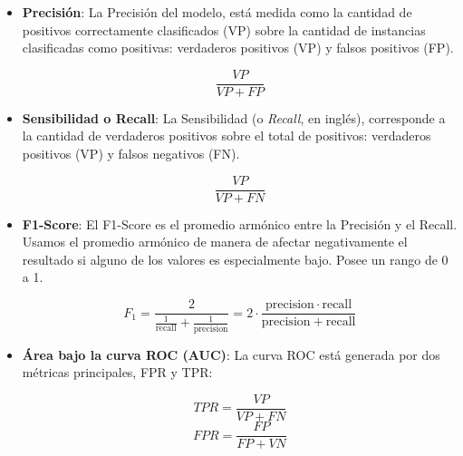 \begin{itemize}

    \item \textbf{Precisión}: La Precisión del modelo, está medida como la cantidad de positivos correctamente clasificados (VP) sobre la cantidad de instancias clasificadas como positivas: verdaderos positivos (VP) y falsos positivos (FP).
    
    \begin{equation*}
        \frac{VP}{VP + FP}
    \end{equation*}
    
    \item \textbf{Sensibilidad o Recall}: La Sensibilidad (o \textit{Recall}, en inglés), corresponde a la cantidad de verdaderos positivos sobre el total de positivos: verdaderos positivos (VP) y falsos negativos (FN).
    
    \begin{equation*}
        \frac{VP}{VP + FN}
    \end{equation*}

    \newpage
    
    \item \textbf{F1-Score}: El F1-Score es el promedio armónico entre la Precisión y el Recall. Usamos el promedio armónico de manera de afectar negativamente el resultado si alguno de los valores es especialmente bajo. Posee un rango de 0 a 1. 
    
    \begin{equation*}
        F_1 = \frac{2}{\tfrac{1}{\mathrm{recall}} + \tfrac{1}{\mathrm{precision}}} = 2 \cdot \frac{\mathrm{precision} \cdot \mathrm{recall}}{\mathrm{precision} + \mathrm{recall}}
    \end{equation*}
    
    
    \item \textbf{Área bajo la curva ROC (AUC)}: La curva ROC está generada por dos métricas principales, FPR y TPR:
    
    \begin{multicols}{2}
        \begin{equation*}
        TPR = \frac{VP}{VP + FN}
        \end{equation*}
        \break
        \begin{equation*}
        FPR = \frac{FP}{FP + VN} 
        \end{equation*}
    \end{multicols}
    

\end{itemize}
